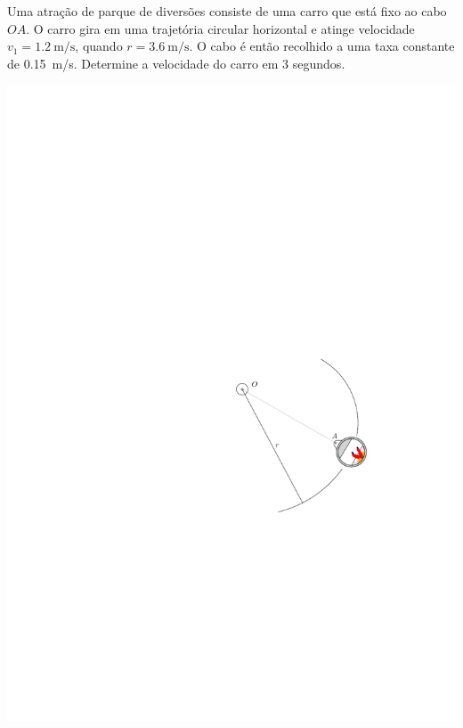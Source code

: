 \item Uma atração de parque de diversões consiste de uma carro que está fixo ao cabo $OA$. O carro gira em uma trajetória circular horizontal e atinge velocidade $v_{1}=\SI{1.2}{\meter/\second}$, quando $r=\SI{3.6}{\meter/\second}$. O cabo é então recolhido a uma taxa constante de \SI{.15}{\meter/\second}. Determine a velocidade do carro em 3 segundos.

\begin{flushright}
	\includegraphics[scale=1]{images/draw_8}
\end{flushright}